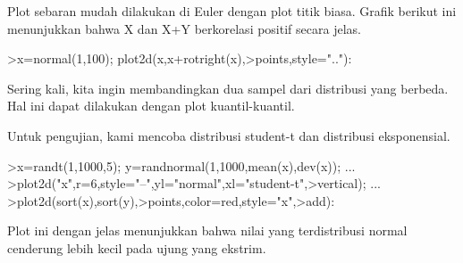 \documentclass[a4paper,10pt]{article}
\begin{document}
\begin{eulernotebook}
\begin{eulercomment}
\begin{eulercomment}
\begin{eulercomment}
\begin{eulercomment}
\begin{eulercomment}
\begin{eulercomment}
\begin{eulercomment}
\begin{eulercomment}
\begin{eulercomment}
\begin{eulercomment}
\begin{eulercomment}
\begin{eulercomment}
\begin{eulercomment}
\begin{eulercomment}
\begin{eulercomment}
\begin{eulercomment}
\begin{eulercomment}
\begin{eulercomment}
\begin{eulercomment}
Plot sebaran mudah dilakukan di Euler dengan plot titik biasa. Grafik
berikut ini menunjukkan bahwa X dan X+Y berkorelasi positif secara
jelas.
\end{eulercomment}
\begin{eulerprompt}
>x=normal(1,100); plot2d(x,x+rotright(x),>points,style=".."):
\end{eulerprompt}
\begin{eulercomment}
Sering kali, kita ingin membandingkan dua sampel dari distribusi yang
berbeda. Hal ini dapat dilakukan dengan plot kuantil-kuantil.

Untuk pengujian, kami mencoba distribusi student-t dan distribusi
eksponensial.
\end{eulercomment}
\begin{eulerprompt}
>x=randt(1,1000,5); y=randnormal(1,1000,mean(x),dev(x)); ...
>plot2d("x",r=6,style="--",yl="normal",xl="student-t",>vertical); ...
>plot2d(sort(x),sort(y),>points,color=red,style="x",>add):
\end{eulerprompt}
\begin{eulercomment}
Plot ini dengan jelas menunjukkan bahwa nilai yang terdistribusi
normal cenderung lebih kecil pada ujung yang ekstrim.


\end{eulercomment}
\end{eulercomment}
\end{eulercomment}
\end{eulercomment}
\end{eulercomment}
\end{eulercomment}
\end{eulercomment}
\end{eulercomment}
\end{eulercomment}
\end{eulercomment}
\end{eulercomment}
\end{eulercomment}
\end{eulercomment}
\end{eulercomment}
\end{eulercomment}
\end{eulercomment}
\end{eulercomment}
\end{eulercomment}
\end{eulercomment}
\end{eulernotebook}
\end{document}
